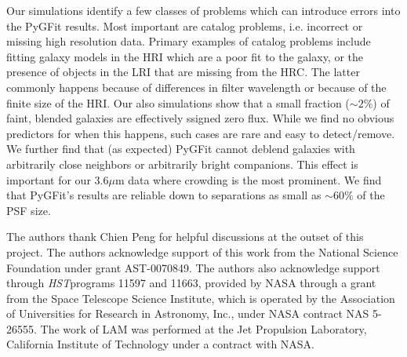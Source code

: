 \documentclass[preprint]{aastex}
\newcommand{\galfit}{GALFIT}
\newcommand{\pygfit}{PyGFit}
\newcommand{\hst}{{\it HST}}
\begin{document}
Our simulations identify a few classes of problems which can introduce errors into the \pygfit{} results.  Most important are catalog problems, i.e. incorrect or missing high resolution data.  Primary examples of catalog problems include fitting galaxy models in the HRI which are a poor fit to the galaxy, or the presence of objects in the LRI that are missing from the HRC.  The latter commonly happens because of differences in filter wavelength or because of the finite size of the HRI.
Our also simulations show that a small fraction ($\sim2\%$) of faint, blended galaxies are effectively ssigned zero flux.  While we find no obvious predictors for when this happens, such cases are rare and easy to detect/remove.  We further find that (as expected) \pygfit{} cannot deblend galaxies with arbitrarily close neighbors or arbitrarily bright companions.  This effect is important for our $3.6\mu$m data where crowding is the most prominent.  We find that \pygfit{}'s results are reliable down to separations as small as $\sim60\%$ of the PSF size.  


\acknowledgements

The authors thank Chien Peng for helpful discussions at the outset of this project. The authors acknowledge support of this work from the National Science Foundation under grant AST-0070849.
The authors also acknowledge support through \hst programs 11597 and 11663, 
provided by NASA through a grant from the Space Telescope
Science Institute, which is operated by the Association of
Universities for Research in Astronomy, Inc., under NASA
contract NAS 5-26555.
The work of LAM was performed at the Jet Propulsion Laboratory, California Institute of Technology under a contract with NASA.







\begin{figure*}
\caption{A flow chart of \pygfit{}'s procedure.  Rectangles denote computational processes executed by \pygfit{} while the page symbols denote data products created by or used by \pygfit{}.  The five data products along the top are inputs which must be provided to \pygfit{}.}\label{fig:flow_chart}
\end{figure*}

\begin{figure*}
\caption{Original images (top row) and residuals (bottom row) from our \galfit{} and \pygfit{} runs in the core of a high redshift ($z=1.243$) galaxy cluster.  From left to right the images correspond to WFC3/F160W, R, H, and $4.5\mu$m.  The WFC3/F160W image was fit with \galfit{}, while all other bands were fit with \pygfit{}.  All panels show the same field of view, and the scale in the top left panel is 10$^{\prime\prime}$ long.}\label{fig:residuals}
\end{figure*}
\end{document}
